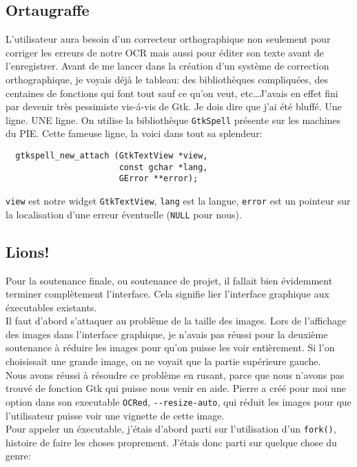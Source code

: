 \documentclass[a4paper,10pt]{report}
\begin{document}
\subsection{Ortaugraffe} %
\label{sec:ortaugraffe}
	L'utilisateur aura besoin d'un correcteur orthographique non seulement pour corriger les erreurs de notre OCR mais aussi pour \'editer son texte avant de l'enregistrer. Avant de me lancer dans la cr\'eation d'un syst\`eme de correction orthographique, je voyais d\'ej\`a le tableau: des biblioth\`eques compliqu\'ees, des centaines de fonctions qui font tout sauf ce qu'on veut, etc\ldots J'avais en effet fini par devenir tr\`es pessimiste vis-\'a-vis de Gtk. Je dois dire que j'ai \'et\'e bluff\'e. Une ligne. UNE ligne. On utilise la biblioth\`eque \verb!GtkSpell! pr\'esente sur les machines du PIE. Cette fameuse ligne, la voici dans tout sa splendeur:
	\begin{lstlisting}
  gtkspell_new_attach (GtkTextView *view,
                       const gchar *lang,
                       GError **error);
	\end{lstlisting}
	\verb!view! est notre widget \verb!GtkTextView!, \verb!lang! est la langue, \verb!error! est un pointeur sur la localisation d'une erreur \'eventuelle (\verb!NULL! pour nous).



\subsection{Lions!} %
\label{sub:lions_}
Pour la soutenance finale, ou soutenance de projet, il fallait bien \'evidemment terminer compl\`etement l'interface. Cela signifie lier l'interface graphique aux \'executables existants. \\
Il faut d'abord s'attaquer au probl\`eme de la taille des images. Lors de l'affichage des images dans l'interface graphique, je n'avais pas r\'eussi pour la deuxi\`eme soutenance \`a r\'eduire les images pour qu'on puisse les voir enti\`erement. Si l'on choisissait une grande image, on ne voyait que la partie sup\'erieure gauche.\\
Nous avons r\'eussi \`a r\'esoudre ce problème en rusant, parce que nous n'avons pas trouv\'e de fonction Gtk qui puisse nous venir en aide. Pierre a cr\'e\'e pour moi une option dans son executable \verb!OCRed!, \verb!--resize-auto!, qui r\'eduit les images pour que l'utilisateur puisse voir une vignette de cette image.\\
Pour appeler un \'executable, j'\'etais d'abord parti sur l'utilisation d'un \verb!fork()!, histoire de faire les choses proprement. J'\'etais donc parti sur quelque chose du genre:
\end{document}
